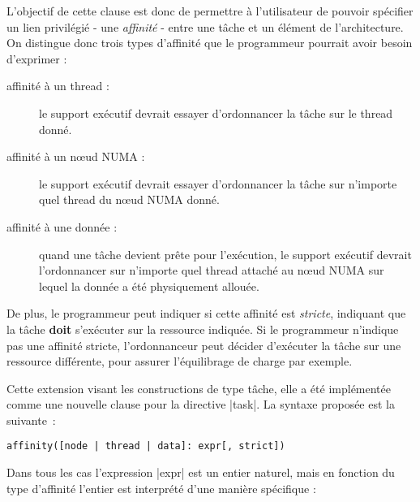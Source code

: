 L'objectif de cette clause est donc de permettre à l'utilisateur de pouvoir spécifier un lien privilégié - une \emph{affinité} - entre une tâche et un élément de l'architecture.
On distingue donc trois types d'affinité que le programmeur pourrait avoir besoin d'exprimer :

\begin{description}
    \item [affinité à un thread :]
      le support exécutif devrait essayer d'ordonnancer la tâche sur le thread donné.
    \item [affinité à un nœud NUMA :]
      le support exécutif devrait essayer d'ordonnancer la tâche sur n'importe
      quel thread du nœud NUMA donné.

    \item [affinité à une donnée :]
      quand une tâche devient prête pour l'exécution, le support exécutif devrait
      l'ordonnancer sur n'importe quel thread attaché au nœud NUMA sur lequel
      la donnée a été physiquement allouée.
\end{description}

De plus, le programmeur peut indiquer si cette affinité est \emph{stricte}, indiquant que la tâche \textbf{doit} s'exécuter sur la ressource indiquée.
Si le programmeur n'indique pas une affinité stricte, l'ordonnanceur peut décider d'exécuter la tâche sur une ressource différente, pour assurer l'équilibrage de charge par exemple.

Cette extension visant les constructions de type tâche, elle a été implémentée comme une nouvelle clause pour la directive |task|. La syntaxe proposée est la suivante~:

\begin{lstlisting}
affinity([node | thread | data]: expr[, strict])
\end{lstlisting}

Dans tous les cas l'expression |expr| est un entier naturel, mais en fonction du type d'affinité l'entier est interprété d'une manière spécifique :

